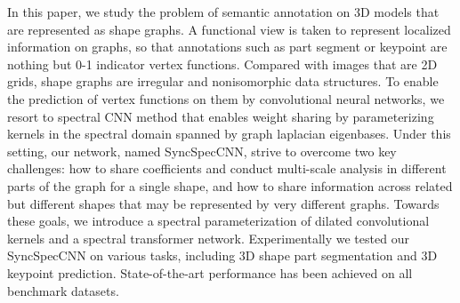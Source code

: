 In this paper, we study the problem of semantic annotation on 3D models that are represented as shape graphs.  A functional view is taken to represent localized information on graphs, so that annotations such as part segment or keypoint are nothing but 0-1 indicator vertex functions. Compared with images that are 2D grids, shape graphs are irregular and nonisomorphic data structures. To enable the prediction of vertex functions on them by convolutional neural networks, we resort to spectral CNN method that enables weight sharing by parameterizing kernels in the spectral domain spanned by graph laplacian eigenbases. Under this setting, our network, named SyncSpecCNN, strive to overcome two key challenges: how to share coefficients and conduct multi-scale analysis in different parts of the graph for a single shape, and how to share information across related but different shapes that may be represented by very different graphs. Towards these goals, we introduce a spectral parameterization of dilated convolutional kernels and a spectral transformer network. Experimentally we tested our SyncSpecCNN on various tasks, including 3D shape part segmentation and 3D keypoint prediction.  State-of-the-art performance has been achieved on all benchmark datasets.
